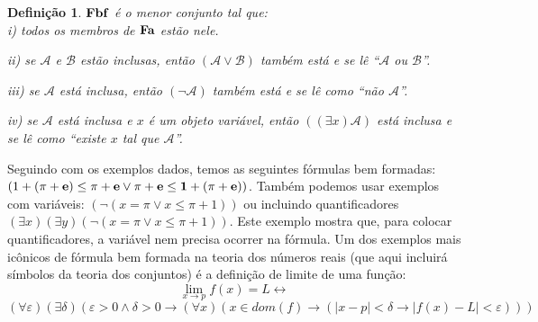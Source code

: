 \documentclass[11pt,a4paper]{article}
\newtheorem{mydef}{Definição}[section]
\theoremstyle{definition}
\begin{document}
\begin{mydef}
	
	$\textrm{\textbf{Fbf}}$ é o menor conjunto tal que:\\
	
	i) todos os membros de $\textrm{\textbf{Fa}}$ estão nele.\
	
	ii) se $\mathscr{A}$ e $\mathscr{B}$ estão inclusas, então $(\mathscr{A} \vee \mathscr{B})$ também está e se lê ``$\mathscr{A}$ ou $\mathscr{B}$''.\
	
	iii) se $\mathscr{A}$ está inclusa, então $(\neg \mathscr{A})$ também está e se lê como ``não  $\mathscr{A}$''. \
	
	iv) se  $\mathscr{A}$ está inclusa e $x$ é um objeto variável, então $((\exists x )\mathscr{A})$ está inclusa e se lê como ``existe $x$ tal que $\mathscr{A}$''.
	
\end{mydef}	

Seguindo com os exemplos dados, temos as seguintes fórmulas bem formadas: $(1+(\pi+\bf{e})\leq \pi+\bf{e} \vee \pi+\bf{e}\leq 1+(\pi+\bf{e}))$. Também podemos usar exemplos com variáveis: $(\neg (x=\pi \vee x\leq \pi+1))$ ou incluindo quantificadores $(\exists x)(\exists y)(\neg (x=\pi \vee x\leq \pi+1))$. Este exemplo mostra que, para colocar quantificadores, a variável nem precisa ocorrer na fórmula. Um dos exemplos mais icônicos de fórmula bem formada na teoria dos números reais (que aqui incluirá símbolos da teoria dos conjuntos) é a definição de limite de uma função: $$\lim_{x\rightarrow p}f(x)=L \leftrightarrow$$ $$(\forall \varepsilon)(\exists \delta)(\varepsilon > 0 \wedge \delta >0 \rightarrow (\forall x)(x\in dom(f)\rightarrow (|x-p|<\delta \rightarrow |f(x)-L|<\varepsilon)))$$
\end{document}

